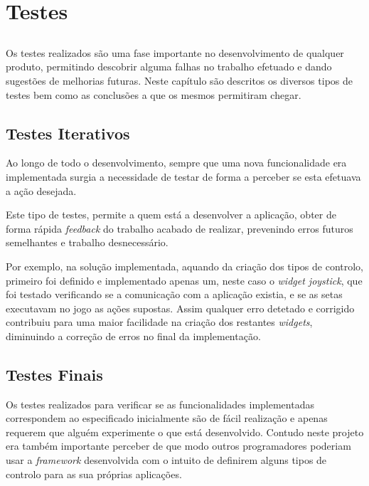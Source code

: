 \chapter{Testes} \label{chap:testes}

\section*{}

Os testes realizados são uma fase importante no desenvolvimento de qualquer produto, permitindo descobrir alguma falhas no trabalho efetuado e dando sugestões de melhorias futuras.
Neste capítulo são descritos os diversos tipos de testes bem como as conclusões a que os mesmos permitiram chegar.

\section{Testes Iterativos}

	Ao longo de todo o desenvolvimento, sempre que uma nova funcionalidade era implementada surgia a necessidade de testar de forma a perceber se esta efetuava a ação desejada.

	Este tipo de testes, permite a quem está a desenvolver a aplicação, obter de forma rápida \textit{feedback} do trabalho acabado de realizar, prevenindo erros futuros semelhantes e trabalho desnecessário.

	Por exemplo, na solução implementada, aquando da criação dos tipos de controlo, primeiro foi definido e implementado apenas um, neste caso o \textit{widget joystick}, que foi testado verificando se a comunicação com a aplicação existia, e se as setas executavam no jogo as ações supostas. Assim qualquer erro detetado e corrigido contribuiu para uma maior facilidade na criação dos restantes \textit{widgets}, diminuindo a correção de erros no final da implementação.


\section{Testes Finais}
	
	Os testes realizados para verificar se as funcionalidades implementadas correspondem ao especificado inicialmente são de fácil realização e apenas requerem que alguém experimente o que está desenvolvido. Contudo neste projeto era também importante perceber de que modo outros programadores poderiam usar a \textit{framework} desenvolvida com o intuito de definirem alguns tipos de controlo para as sua próprias aplicações.

